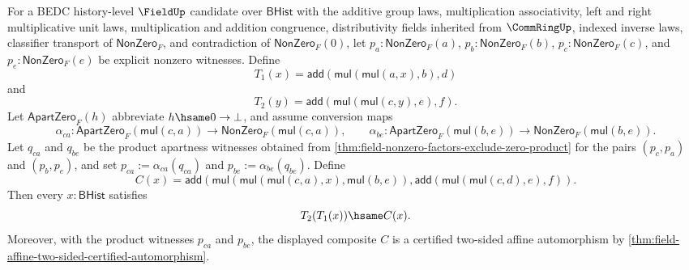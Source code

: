\begin{theorem}
\label{thm:field-affine-two-sided-automorphism-composition}
For a BEDC history-level $\FieldUp$ candidate over $\mathsf{BHist}$ with the
additive group laws, multiplication associativity, left and right
multiplicative unit laws, multiplication and addition congruence,
distributivity fields inherited from $\CommRingUp$, indexed inverse laws,
classifier transport of $\mathsf{NonZero}_F$, and contradiction of
$\mathsf{NonZero}_F(0)$, let
$p_a:\mathsf{NonZero}_F(a)$, $p_b:\mathsf{NonZero}_F(b)$,
$p_c:\mathsf{NonZero}_F(c)$, and $p_e:\mathsf{NonZero}_F(e)$ be explicit
nonzero witnesses. Define
$$
T_1(x)=\mathsf{add}(\mathsf{mul}(\mathsf{mul}(a,x),b),d)
$$
and
$$
T_2(y)=\mathsf{add}(\mathsf{mul}(\mathsf{mul}(c,y),e),f).
$$
Let $\mathsf{ApartZero}_F(h)$ abbreviate $h\hsame0\to\bot$, and assume
conversion maps
$$
\alpha_{ca}:\mathsf{ApartZero}_F(\mathsf{mul}(c,a))\to
\mathsf{NonZero}_F(\mathsf{mul}(c,a)),
\qquad
\alpha_{be}:\mathsf{ApartZero}_F(\mathsf{mul}(b,e))\to
\mathsf{NonZero}_F(\mathsf{mul}(b,e)).
$$
Let $q_{ca}$ and $q_{be}$ be the product apartness witnesses obtained from
\autoref{thm:field-nonzero-factors-exclude-zero-product} for the pairs
$(p_c,p_a)$ and $(p_b,p_e)$, and set
$p_{ca}:=\alpha_{ca}(q_{ca})$ and $p_{be}:=\alpha_{be}(q_{be})$. Define
$$
C(x)=
\mathsf{add}(
\mathsf{mul}(\mathsf{mul}(\mathsf{mul}(c,a),x),\mathsf{mul}(b,e)),
\mathsf{add}(\mathsf{mul}(\mathsf{mul}(c,d),e),f)).
$$
Then every $x:\mathsf{BHist}$ satisfies
$$
T_2(T_1(x))\hsame C(x).
$$
Moreover, with the product witnesses $p_{ca}$ and $p_{be}$, the displayed
composite $C$ is a certified two-sided affine automorphism by
\autoref{thm:field-affine-two-sided-certified-automorphism}.
\end{theorem}
